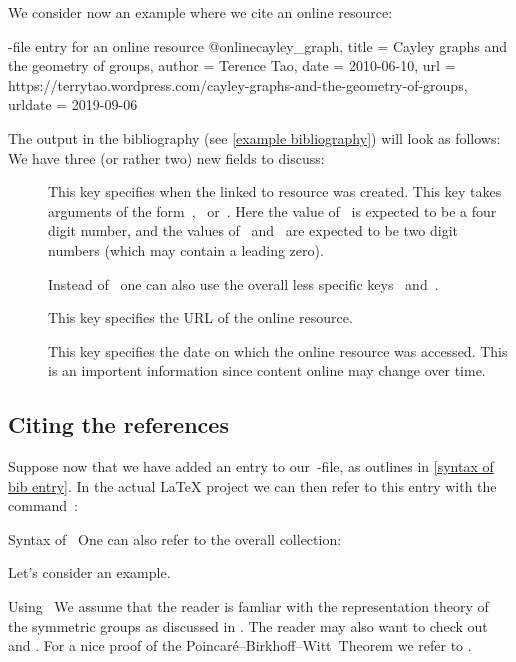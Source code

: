 \begin{refsection}
We consider now an example where we cite an online resource:
\begin{showcode}{-file entry for an online resource}
@online{cayley_graph,
  title   = {Cayley graphs and the geometry of groups},
  author  = {Terence Tao},
  date    = {2010-06-10},
  url     = {https://terrytao.wordpress.com/cayley-graphs-and-the-geometry-of-groups},
  urldate = {2019-09-06}
}
\end{showcode}
The output in the bibliography (see \cref{example bibliography}) will look as follows:
We have three (or rather two) new fields to discuss:
\begin{description}
  \item[]
    This key specifies when the linked to resource was created.
    This key takes arguments of the form~,~ or~.
    Here the value of~ is expected to be a four digit number, and the values of~ and~ are expected to be two digit numbers (which may contain a leading zero).
    
    Instead of~ one can also use the overall less specific keys~ and~.
  \item[]
    This key specifies the URL of the online resource.
  \item[]
    This key specifies the date on which the online resource was accessed.
    This is an importent information since content online may change over time.
\end{description}



\subsection{Citing the references}

Suppose now that we have added an entry to our~-file, as outlines in \cref{syntax of bib entry}.
In the actual {\LaTeX} project we can then refer to this entry with the command~:
\begin{showcode}{Syntax of~}
\cite[details]{label}
One can also refer to the overall collection:
\end{showcode}
Let’s consider an example.
\begin{showlatex}[label = {using cite}]{Using~}
We assume that the reader is famliar with the representation theory of the symmetric groups as discussed in \cite[\S 4]{fultonharris2004}.
The reader may also want to check out \cite{benson1991} and \cite{cayley_graph}.
For a nice proof of the Poincaré--Birkhoff--Witt~Theorem we refer to \cite[\S 3]{diamond_lemma}.
\end{showlatex}


\end{refsection}
